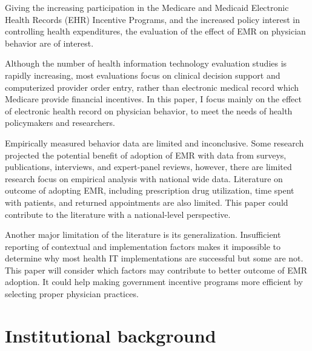 Giving the increasing participation in the Medicare and Medicaid Electronic Health Records (EHR) Incentive Programs, and the increased policy interest in controlling health expenditures, the evaluation of the effect of EMR on physician behavior are of interest.

Although the number of health information technology evaluation studies is rapidly increasing, most evaluations focus on clinical decision support and computerized provider order entry, rather than electronic medical record which Medicare provide financial incentives. In this paper, I focus mainly on the effect of electronic health record on physician behavior, to meet the needs of health policymakers and researchers.

Empirically measured behavior data are limited and inconclusive. Some research projected the potential benefit of adoption of EMR with data from surveys, publications, interviews, and expert-panel reviews, however, there are limited research focus on empirical analysis with national wide data. Literature on outcome of adopting EMR, including prescription drug utilization, time spent with patients, and returned appointments are also limited. This paper could contribute to the literature with a national-level perspective.

Another major limitation of the literature is its generalization. Insufficient reporting of contextual and implementation factors makes it impossible to determine why most health IT implementations are successful but some are not. This paper will consider which factors may contribute to better outcome of EMR adoption. It could help making government incentive programs more efficient by selecting proper physician practices.

\section{Institutional background}
